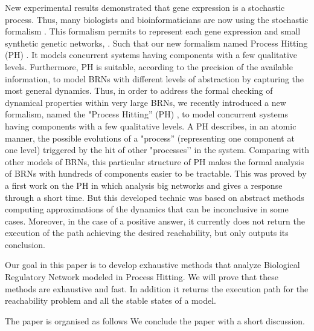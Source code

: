 New experimental results \cite{elowitz2002stochastic} \cite{blake2003noise} demonstrated that gene expression is a stochastic process. Thus, many biologists and bioinformaticians are now using the stochastic formalism \cite{arkin1998stochastic}. This formalism permits to represent each gene expression \cite{raser2005noise} and small synthetic genetic networks, \cite{elowitz2000synthetic} \cite{gardner2000construction}. Such that our new formalism named Process Hitting (PH) \cite{PMR10-TCSB}. It models concurrent systems having components with a few qualitative levels. Furthermore, PH is suitable, according to the precision of the available information, to model BRNs with different levels of abstraction by capturing the most general dynamics.
Thus, in order to address the formal checking of dynamical properties within very large BRNs, we recently introduced a new formalism, named the "Process Hitting'' (PH) \cite{PMR10-TCSB}, to model concurrent systems having components with a few qualitative levels. A PH describes, in an atomic manner, the possible evolutions of a "process'' (representing one component at one level) triggered by the hit of other "processes’’ in the system. Comparing with other models of BRNs, this particular structure of PH makes the formal analysis of BRNs with hundreds of components easier to be tractable. This was proved by a first work on the PH in \cite{PMR12-MSCS} which analysis big networks and gives a response through a short time. But this developed technic was based on abstract methods computing approximations of the dynamics that can be inconclusive in some cases. Moreover, in the case of a positive answer, it currently does not return the execution of the path achieving the desired reachability, but only outputs its conclusion.

Our goal in this paper is to develop exhaustive methods that analyze Biological Regulatory Network modeled in Process Hitting. We will prove that these methods are exhaustive and fast. In addition it returns the execution path for the reachability problem and all the stable states of a model.

The paper is organised as follows %
We conclude the paper with a short discussion. 